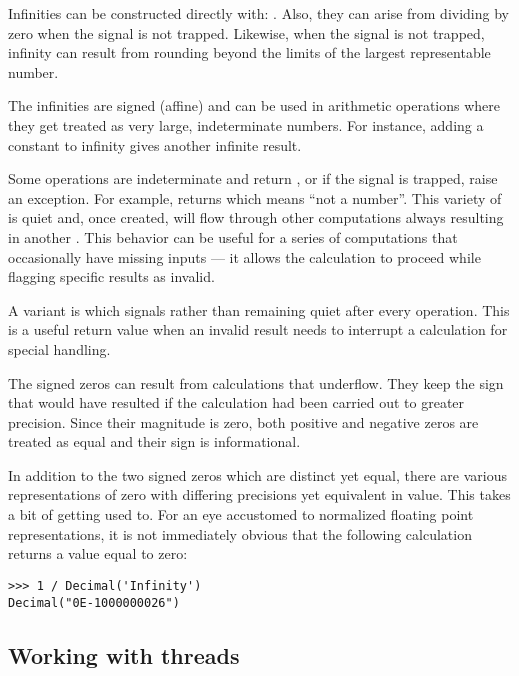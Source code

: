 Infinities can be constructed directly with:  . Also,
they can arise from dividing by zero when the 
signal is not trapped.  Likewise, when the  signal is not
trapped, infinity can result from rounding beyond the limits of the largest
representable number.

The infinities are signed (affine) and can be used in arithmetic operations
where they get treated as very large, indeterminate numbers.  For instance,
adding a constant to infinity gives another infinite result.

Some operations are indeterminate and return , or if the
 signal is trapped, raise an exception.  For
example,  returns  which means ``not a number''.  This
variety of  is quiet and, once created, will flow through other
computations always resulting in another .  This behavior can be
useful for a series of computations that occasionally have missing inputs ---
it allows the calculation to proceed while flagging specific results as
invalid.     

A variant is  which signals rather than remaining quiet
after every operation.  This is a useful return value when an invalid
result needs to interrupt a calculation for special handling.

The signed zeros can result from calculations that underflow.
They keep the sign that would have resulted if the calculation had
been carried out to greater precision.  Since their magnitude is
zero, both positive and negative zeros are treated as equal and their
sign is informational.

In addition to the two signed zeros which are distinct yet equal,
there are various representations of zero with differing precisions
yet equivalent in value.  This takes a bit of getting used to.  For
an eye accustomed to normalized floating point representations, it
is not immediately obvious that the following calculation returns
a value equal to zero:          

\begin{verbatim}
>>> 1 / Decimal('Infinity')
Decimal("0E-1000000026")
\end{verbatim}

\subsection{Working with threads \label{decimal-threads}}

